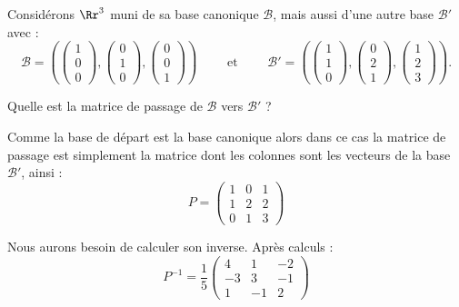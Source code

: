 \documentclass[11pt,class=report,crop=false]{standalone}
\begin{document}
\begin{exemple}
\label{ex:matpass}
Considérons $\Rr^3$ muni de sa base canonique $\mathcal{B}$, mais aussi d'une autre base $\mathcal{B}'$ avec :
$$\mathcal{B} =
\left(
\begin{pmatrix} 1\\0\\0\end{pmatrix},
\begin{pmatrix} 0\\1\\0\end{pmatrix},
\begin{pmatrix} 0\\0\\1\end{pmatrix}
\right)
\qquad \text{ et } \qquad
\mathcal{B}' =
\left(
\begin{pmatrix} 1 \\ 1 \\ 0\end{pmatrix},
\begin{pmatrix} 0 \\ 2 \\ 1\end{pmatrix},
\begin{pmatrix} 1 \\ 2 \\ 3\end{pmatrix}
\right).$$

Quelle est la matrice de passage de $\mathcal{B}$ vers $\mathcal{B}'$ ?

Comme la base de départ est la base canonique alors dans ce cas la matrice de passage est simplement la matrice dont les colonnes sont les vecteurs de la base $\mathcal{B}'$, ainsi :
$$P = \begin{pmatrix}
1 & 0 & 1 \\
1 & 2 & 2 \\
0 & 1 & 3
\end{pmatrix}$$


Nous aurons besoin de calculer son inverse. Après calculs :
$$P^{-1} = \frac15 
\begin{pmatrix}
4 & 1 & -2 \\
-3 & 3 & -1 \\
1 & -1 & 2	
\end{pmatrix}$$


\end{exemple}
\end{document}
